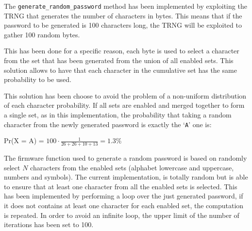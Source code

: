 The \texttt{generate\_random\_password} method has been implemented by exploiting the TRNG that generates the number of characters in bytes. This means that if the password to be generated is 100 characters long, the TRNG will be exploited to gather 100 random bytes. 

This has been done for a specific reason, each byte is used to select a character from the set that has been generated from the union of all enabled sets.\newline\newline
This solution allows to have that each character in the cumulative set has the same probability to be used.

This solution has been choose to avoid the problem of a non-uniform distribution of each character probability. If all sets are enabled and merged together to form a single set, as in this implementation, the probability that taking a random character from the newly generated password is exactly the `\texttt{A}' one is:
\begin{center}
	Pr(X = A) = $100 \cdot \frac{1}{26+26+10+13} = 1.3 \%$
\end{center}

The firmware function used to generate a random password is based on randomly select $N$ characters from the enabled sets (alphabet lowercase and uppercase, numbers and symbols). The current implementation, is totally random but is able to ensure that at least one character from all the enabled sets is selected. This has been implemented by performing a loop over the just generated password, if it does not contains at least one character for each enabled set, the computation is repeated. In order to avoid an infinite loop, the upper limit of the number of iterations has been set to 100.



